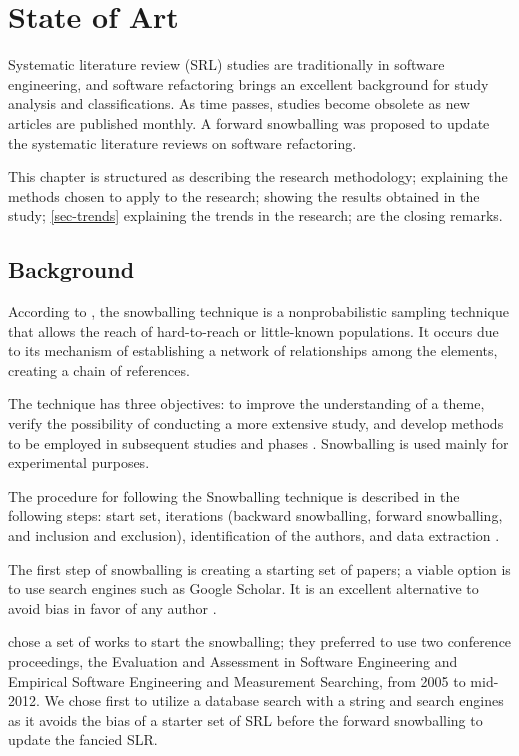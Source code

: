 \chapter{State of Art}%
\label{chap-state}

Systematic literature review (SRL) studies are traditionally in software engineering, and software refactoring brings an excellent background for study analysis and classifications. As time passes, studies become obsolete as new articles are published monthly. A forward snowballing was proposed to update the systematic literature reviews on software refactoring.

This chapter is structured as  describing the research methodology;  explaining the methods chosen to apply to the research;  showing the results obtained in the study; \cref{sec-trends} explaining the trends in the research;  are the closing remarks.

\section{Background}
\label{sec-background}
According to \cite{bernard2006}, the snowballing technique is a nonprobabilistic sampling technique that allows the reach of hard-to-reach or little-known populations. It occurs due to its mechanism of establishing a network of relationships among the elements, creating a chain of references.

The technique has three objectives: to improve the understanding of a theme, verify the possibility of conducting a more extensive study, and develop methods to be employed in subsequent studies and phases \cite{vinuto2014}. Snowballing is used mainly for experimental purposes.

The procedure for following the Snowballing technique is described in the following steps: start set, iterations (backward snowballing, forward snowballing, and inclusion and exclusion), identification of the authors, and data extraction \cite{Wohlin2014}.

The first step of snowballing is creating a starting set of papers; a viable option is to use search engines such as Google Scholar. It is an excellent alternative to avoid bias in favor of any author \cite{Wohlin2014}.

\textcite{Kitchenham2013} chose a set of works to start the snowballing; they preferred to use two conference proceedings, the Evaluation and Assessment in Software Engineering and Empirical Software Engineering and Measurement Searching, from 2005 to mid-2012. We chose first to utilize a database search with a string and search engines as it avoids the bias of a starter set of SRL before the forward snowballing to update the fancied SLR.

